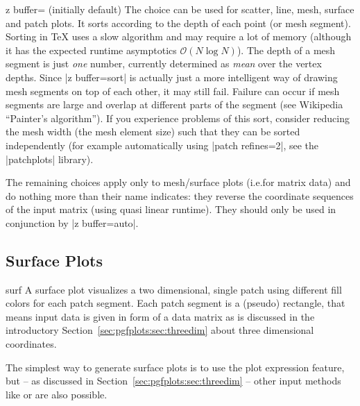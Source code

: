 {\begin{pgfplotskey}{z buffer= (initially default)%
}
    The choice  can be used for scatter, line, mesh, surface
    and patch plots. It sorts according to the depth of each point (or mesh
    segment). Sorting in \TeX{} uses a slow algorithm and may require a lot of
    memory (although it has the expected runtime asymptotics $\mathcal O(N \log
    N)$). The depth of a mesh segment is just \emph{one} number, currently
    determined as \emph{mean} over the vertex depths. Since |z buffer=sort| is
    actually just a more intelligent way of drawing mesh segments on top of
    each other, it may still fail. Failure can occur if mesh segments are large
    and overlap at different parts of the segment (see Wikipedia ``Painter's
    algorithm''). If you experience problems of this sort, consider reducing
    the mesh width (the mesh element size) such that they can be sorted
    independently (for example automatically using |patch refines=2|, see the
    |patchplots| library).

    The remaining choices apply only to mesh/surface plots (i.e.\@ for matrix
    data) and do nothing more than their name indicates: they reverse the
    coordinate sequences of the input matrix (using quasi linear runtime). They
    should only be used in conjunction by |z buffer=auto|.
\end{pgfplotskey}


\subsection{Surface Plots}
\label{sec:pgfplots:surfplots}

\begin{plottype}[/pgfplots]{surf}
    A surface plot visualizes a two dimensional, single patch using different
    fill colors for each patch segment. Each patch segment is a (pseudo)
    rectangle, that means input data is given in form of a data matrix as is
    discussed in the introductory Section~\ref{sec:pgfplots:sec:threedim} about
    three dimensional coordinates.

\pgfplotsexpensiveexample
\begin{codeexample}[]
\end{codeexample}

    The simplest way to generate surface plots is to use the plot expression
    feature, but -- as discussed in Section~\ref{sec:pgfplots:sec:threedim} --
    other input methods like  or
     are also possible.


\end{plottype}}
